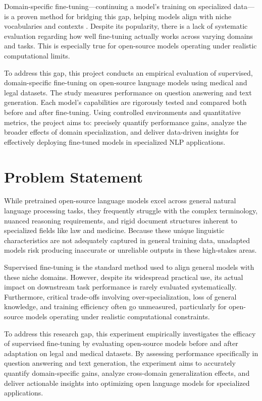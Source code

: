 \documentclass[12pt, letterpaper]{article}
\begin{document}
Domain-specific fine-tuning---continuing a model's training on specialized data---is a proven method for bridging this gap, helping models align with niche vocabularies and contexts \citep{gururangan2020dont}. Despite its popularity, there is a lack of systematic evaluation regarding how well fine-tuning actually works across varying domains and tasks. This is especially true for open-source models operating under realistic computational limits.

To address this gap, this project conducts an empirical evaluation of supervised, domain-specific fine-tuning on open-source language models using medical and legal datasets. The study measures performance on question answering and text generation. Each model's capabilities are rigorously tested and compared both before and after fine-tuning. Using controlled environments and quantitative metrics, the project aims to: precisely quantify performance gains, analyze the broader effects of domain specialization, and deliver data-driven insights for effectively deploying fine-tuned models in specialized NLP applications.

\section{Problem Statement}
\label{sec:problem-statement}

While pretrained open-source language models excel across general natural language processing tasks, they frequently struggle with the complex terminology, nuanced reasoning requirements, and rigid document structures inherent to specialized fields like law and medicine. Because these unique linguistic characteristics are not adequately captured in general training data, unadapted models risk producing inaccurate or unreliable outputs in these high-stakes areas.

Supervised fine-tuning is the standard method used to align general models with these niche domains. However, despite its widespread practical use, its actual impact on downstream task performance is rarely evaluated systematically. Furthermore, critical trade-offs involving over-specialization, loss of general knowledge, and training efficiency often go unmeasured, particularly for open-source models operating under realistic computational constraints.

To address this research gap, this experiment empirically investigates the efficacy of supervised fine-tuning by evaluating open-source models before and after adaptation on legal and medical datasets. By assessing performance specifically in question answering and text generation, the experiment aims to accurately quantify domain-specific gains, analyze cross-domain generalization effects, and deliver actionable insights into optimizing open language models for specialized applications.
\end{document}
